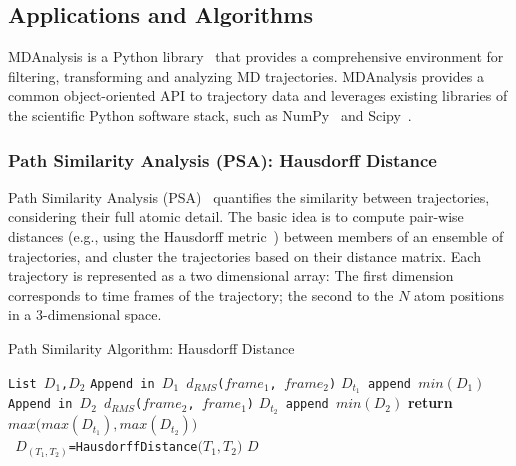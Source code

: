 \subsection{Applications and Algorithms}
\label{ssec:mda}

MDAnalysis is a Python library~\cite{michaud2011mdanalysis,gowers2016mdanalysis}
that provides a comprehensive environment for filtering, transforming and
analyzing MD trajectories. MDAnalysis provides
a common object-oriented API to trajectory data and leverages existing libraries
of the scientific Python software stack, such as NumPy~\cite{numpy} and
Scipy~\cite{scipy}.

\subsubsection*{Path Similarity Analysis (PSA): Hausdorff Distance}

Path Similarity Analysis (PSA)~\cite{seyler2015path} quantifies the
similarity between trajectories, considering their full atomic detail. The
basic idea is to compute pair-wise distances (e.g., using the Hausdorff
metric~\cite{huttenlocher1993comparing}) between members of an ensemble of
trajectories, and cluster the trajectories based on their distance matrix. Each
trajectory is represented as a two dimensional array: The first dimension
corresponds to time frames of the trajectory; the second to the $N$ atom
positions in a 3-dimensional space.

\begin{algorithm}[t]
    \scriptsize
    \caption{Path Similarity Algorithm: Hausdorff Distance}
    \label{alg:hausdorff}
    \begin{algorithmic}[1]
        \State \texttt{List $D_1$,$D_2$}
        \State \texttt{Append in $D_1$ $d_{RMS}$($frame_1$, $frame_2$)}
        \EndFor
        \State \texttt{$D_{t_1}$ append $min(D_1)$}
        \EndFor
        \State \texttt{Append in $D_2$ $d_{RMS}$($frame_2$, $frame_1$)}
        \EndFor
        \State\texttt{$D_{t_2}$ append $min(D_2)$}
        \EndFor
        \State \textbf{return} $max\Big(max(D_{t_1}),max(D_{t_2})\Big)$
        \EndProcedure
        \\
        \State \texttt{ $D_{( T_1,T_2 )}$=HausdorffDistance$\Big( T_1,T_2 \Big)$}
        \EndFor
        \EndFor
        \State \Return $D$
        \EndProcedure
    \end{algorithmic}
\end{algorithm}

